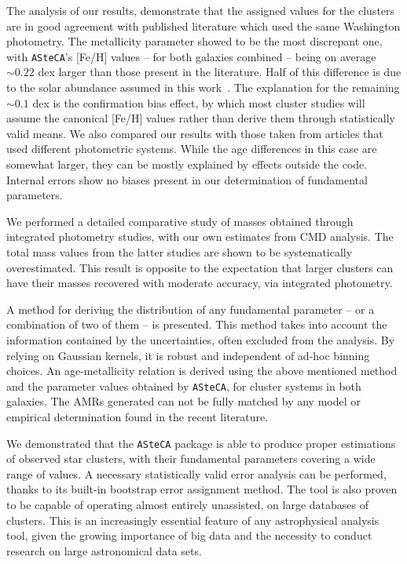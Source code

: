 \documentclass{aa}
\begin{document}
The analysis of our results, demonstrate that the assigned values for the
clusters are in good agreement with published literature which used the same
Washington photometry.
%
The metallicity parameter showed to be the most discrepant one, with \texttt
{ASteCA}'s [Fe/H] values -- for both galaxies combined -- being on average
${\sim}0.22$ dex larger than those present in the literature. Half of this
difference is due to the solar abundance assumed in this work~\citep[$z_{\odot}
{=}0.0152$;][]{Bressan_2012}. The explanation for the remaining ${\sim}0.1$ dex
is the confirmation bias effect, by which most cluster studies will assume the
canonical [Fe/H] values rather than derive them through statistically
valid means.
%
We also compared our results with those taken from articles that used different
photometric systems. While the age differences in this case are somewhat
larger, they can be mostly explained by effects outside the code.
Internal errors show no biases present in our determination of fundamental
parameters.

We performed a detailed comparative study of masses obtained through integrated
photometry studies, with our own estimates from CMD analysis. The total mass
values from the latter studies are shown to be systematically overestimated.
This result is opposite to the expectation that larger clusters can have their
masses recovered with moderate accuracy, via integrated photometry.

A method for deriving the distribution of any fundamental parameter -- or a
combination of two of them -- is presented. This method takes into account the
information contained by the uncertainties, often excluded from the analysis.
By relying on Gaussian kernels, it is robust and independent of ad-hoc binning
choices.
%
An age-metallicity relation is derived using the above mentioned method and the
parameter values obtained by \texttt{ASteCA}, for cluster systems in both
galaxies. The AMRs generated can not be fully matched by any model or empirical
determination found in the recent literature.

We demonstrated that the \texttt{ASteCA} package is able to produce proper
estimations of observed star clusters, with their fundamental parameters
covering a wide range of values. A necessary statistically valid error analysis
can be performed, thanks to its built-in bootstrap error assignment method.
%
The tool is also proven to be capable of operating almost entirely unassisted,
on large databases of clusters. This is an increasingly essential feature
of any astrophysical analysis tool, given the growing importance of big data and
the necessity to conduct research on large astronomical data sets.
\end{document}
